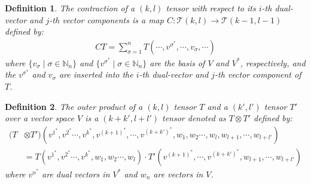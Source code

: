 \documentclass[11pt, onesided]{book}
\theoremstyle{break}
\theoremstyle{break}
\newtheorem{defn}{Definition}[thm]
\newcommand{\N}{\mathbb{N}}
\begin{document}
\begin{defn}
The contraction of a $(k,l)$ tensor with respect to its $i$-th dual-vector and $j$-th vector components is a map $C:\mathcal{T}(k,l) \to \mathcal{T}(k-1,l-1)$ defined by:
\begin{align*}
CT = \sum_{\sigma=1}^n T(\cdots, v^{\sigma^*}, \cdots, v_{\sigma},\cdots) 
\end{align*}
where $\{v_\sigma \mid \sigma \in \N_n\}$ and $\{v^{\sigma^*}\mid \sigma \in \N_n\}$ are the basis of $V$ and $V^*$, respectively, and the $v^{\sigma^*}$ and $v_\sigma$ are inserted into the $i$-th dual-vector and $j$-th vector component of $T$. 
\end{defn} 

\begin{defn}
The outer product of a $(k,l)$ tensor $T$ and a $(k',l')$ tensor $T'$ over a vector space $V$ is a $(k+k', l+l')$ tensor denoted as $T \otimes T'$ defined by:
\begin{align*}
(T&\otimes T')(v^{1^*}, v^{2^*} \cdots, v^{k^*}, v^{(k+1)^*}, \cdots, v^{(k+k')^*}, w_{1}, w_{2} \cdots, w_{l}, w_{l+1}, \cdots, w_{l+l'})\\
&= T(v^{1^*}, v^{2^*} \cdots, v^{k^*},w_{1}, w_{2} \cdots, w_{l} )\cdot T'(v^{(k+1)^*},\cdots, v^{(k+k')^*},w_{l+1}, \cdots, w_{l+l'} )
\end{align*}
where $v^{n^*}$ are dual vectors in $V^*$ and $w_n$ are vectors in $V$. 
\end{defn}
\end{document}
